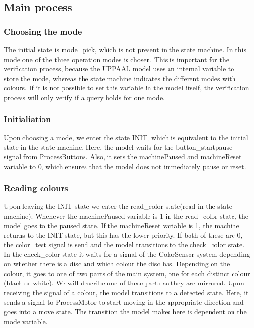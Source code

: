 \documentclass[a4paper,oneside,11pt]{article}
\begin{document}
\subsection{Main process}
\subsubsection{Choosing the mode}
The initial state is mode\_pick, which is not present in the state machine. In this mode one of the three operation modes is chosen. This is important for the verification process, because the UPPAAL model uses an internal variable to store the mode, whereas the state machine indicates the different modes with colours. If it is not possible to set this variable in the model itself, the verification process will only verify if a query holds for one mode.

\subsubsection{Initialiation}
Upon choosing a mode, we enter the state INIT, which is equivalent to the initial state in the state machine. Here, the model waits for the button\_startpause signal from ProcessButtons. Also, it sets the machinePaused and machineReset variable to 0, which ensures that the model does not immediately pause or reset.

\subsubsection{Reading colours}
Upon leaving the INIT state we enter the read\_color state(read in the state machine). Whenever the machinePaused variable is 1 in the read\_color state, the model goes to the paused state. If the machineReset variable is 1, the machine returns to the INIT state, but this has the lower priority. If both of these are 0, the color\_test signal is send and the model transitions to the check\_color state.  In the check\_color state it waits for a signal of the ColorSensor system depending on whether there is a disc and which colour the disc has. Depending on the colour, it goes to one of two parts of the main system, one for each distinct colour (black or white). We will describe one of these parts as they are mirrored. Upon receiving the signal of a colour, the model transitions to a detected state. Here, it sends a signal to ProcessMotor to start moving in the appropriate direction and goes into a move state. The transition the model makes here is dependent on the mode variable.
\end{document}
